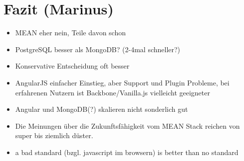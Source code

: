 \section{Fazit (Marinus)}\label{fazit-marinus}

\begin{itemize}
\itemsep1pt\parskip0pt
\item
  MEAN eher nein, Teile davon schon
\item
  PostgreSQL besser als MongoDB? (2-4mal schneller?)
\item
  Konservative Entscheidung oft besser
\item
  AngularJS einfacher Einstieg, aber Support und Plugin Probleme, bei
  erfahrenen Nutzern ist Backbone/Vanilla.js vielleicht geeigneter
\item
  Angular und MongoDB(?) skalieren nicht sonderlich gut
\item
  Die Meinungen über die Zukunftsfähigkeit vom MEAN Stack reichen von
  super bis ziemlich düster.
\item
  a bad standard (bzgl. javascript im browsern) is better than no
  standard
\end{itemize}